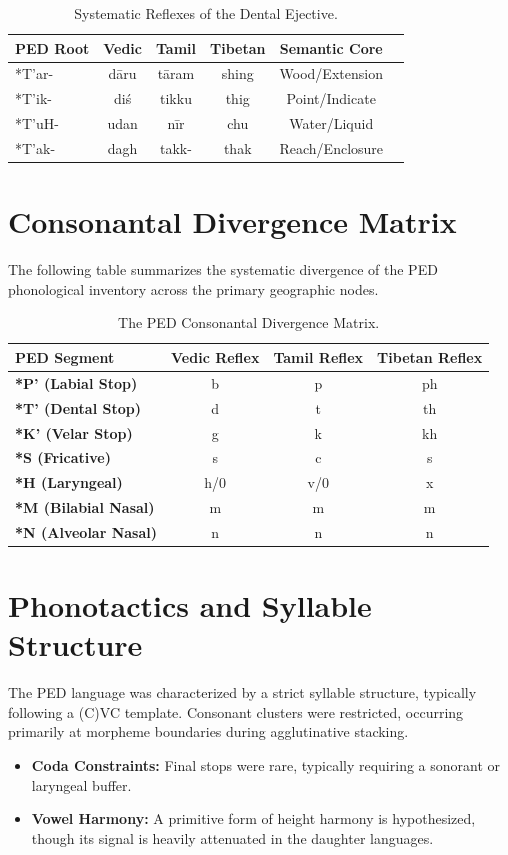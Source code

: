 \begin{table}[h]
\centering
\begin{tabular}{@{}lccccl@{}} \toprule
\textbf{PED Root} & \textbf{Vedic} & \textbf{Tamil} & \textbf{Tibetan} & \textbf{Semantic Core} \\ \midrule
*T'ar- & dāru & tāram & shing & Wood/Extension \\
*T'ik- & diś & tikku & thig & Point/Indicate \\
*T'uH- & udan & nīr & chu & Water/Liquid \\
*T'ak- & dagh & takk- & thak & Reach/Enclosure \\ \bottomrule
\end{tabular}
\caption{Systematic Reflexes of the Dental Ejective.}
\end{table}

\section{Consonantal Divergence Matrix}
The following table summarizes the systematic divergence of the PED phonological inventory across the primary geographic nodes.

\begin{table}[h]
\centering
\begin{tabular}{@{}lccc@{}} \toprule
\textbf{PED Segment} & \textbf{Vedic Reflex} & \textbf{Tamil Reflex} & \textbf{Tibetan Reflex} \\ \midrule
\textbf{*P' (Labial Stop)} & b & p & ph \\
\textbf{*T' (Dental Stop)} & d & t & th \\
\textbf{*K' (Velar Stop)} & g & k & kh \\ \midrule
\textbf{*S (Fricative)} & s & c & s \\
\textbf{*H (Laryngeal)} & h/0 & v/0 & x \\ \midrule
\textbf{*M (Bilabial Nasal)} & m & m & m \\
\textbf{*N (Alveolar Nasal)} & n & n & n \\ \bottomrule
\end{tabular}
\caption{The PED Consonantal Divergence Matrix.}
\end{table}

\section{Phonotactics and Syllable Structure}
The PED language was characterized by a strict syllable structure, typically following a (C)VC template. Consonant clusters were restricted, occurring primarily at morpheme boundaries during agglutinative stacking.
\begin{itemize}
    \item \textbf{Coda Constraints:} Final stops were rare, typically requiring a sonorant or laryngeal buffer.
    \item \textbf{Vowel Harmony:} A primitive form of height harmony is hypothesized, though its signal is heavily attenuated in the daughter languages.
\end{itemize}

